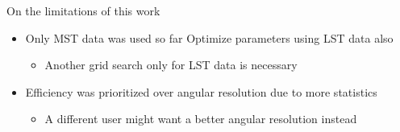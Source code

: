 \begin{frame}{On the limitations of this work}
    \begin{itemize}
        \item Only MST data was used so far \rightarrow{} Optimize parameters using LST data also
        \begin{itemize}
            \item [\rightarrow] Another grid search only for LST data is necessary
        \end{itemize}
        \setlength\itemsep{1em}
        \item Efficiency was prioritized over angular resolution due to more statistics
        \begin{itemize}
            \item [\rightarrow] A different user might want a better angular resolution instead
        \end{itemize}
    \end{itemize}
\end{frame}

